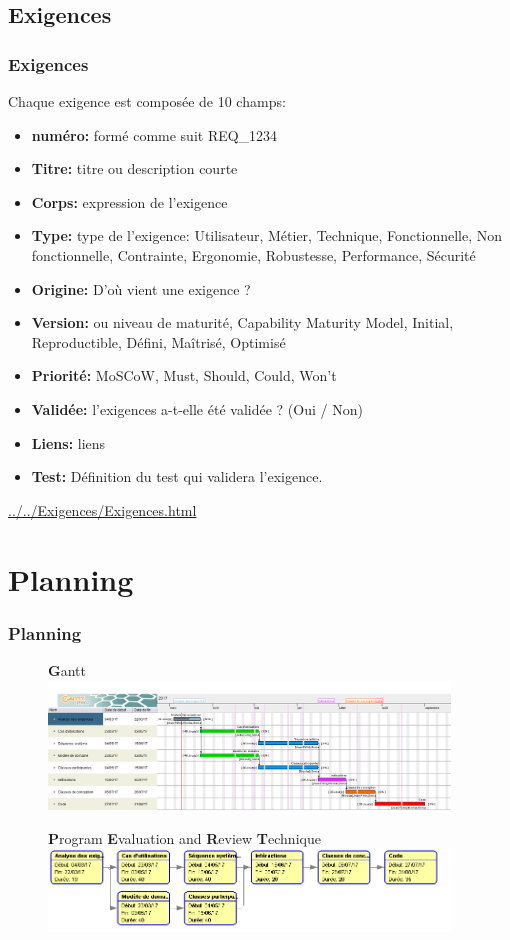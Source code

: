 \documentclass{beamer}
\begin{document}
\subsection{Exigences}
\begin{frame}
 \frametitle{Exigences}
Chaque exigence est composée de 10 champs:
\begin{itemize}
\item \textbf{numéro:} formé comme suit REQ\_1234
\item \textbf{Titre:} titre ou description courte
\item \textbf{Corps:} expression de l'exigence
\item \textbf{Type:} type de l'exigence: Utilisateur, Métier, Technique, Fonctionnelle, Non fonctionnelle, Contrainte, Ergonomie, Robustesse, Performance, Sécurité
\item \textbf{Origine:} D'où vient une exigence ?
\item \textbf{Version:} ou niveau de maturité, Capability Maturity Model, Initial, Reproductible, Défini, Maîtrisé, Optimisé
\item \textbf{Priorité:} MoSCoW, Must, Should, Could, Won't
\item \textbf{Validée:} l'exigences a-t-elle été validée ? (Oui / Non)
\item \textbf{Liens:} liens
\item \textbf{Test:} Définition du test qui validera l'exigence.
\end{itemize}

\url{../../Exigences/Exigences.html}
\end{frame}

\section{Planning}
\begin{frame}[label=planning]
\frametitle{Planning}
\begin{figure}[H]
\textbf{G}antt
\label{Gantt}
  \centering
      \includegraphics[width=0.95\textwidth]{Vitameal_gantt.png} %
\end{figure}

\begin{figure}[H]
\textbf{P}rogram \textbf{E}valuation and \textbf{R}eview \textbf{T}echnique
\label{PERT}
  \centering
      \includegraphics[width=0.95\textwidth]{Vitameal_pert.png} %
\end{figure}
\end{frame}
\end{document}
